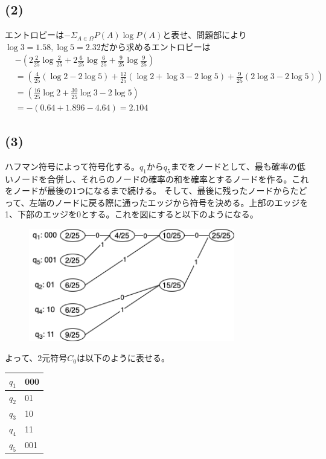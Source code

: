 \documentclass[a4paper,12pt,xelatex,ja=standard]{bxjsarticle}
\begin{document}
  \subsection*{(2)}
  エントロピーは$-\Sigma_{A \in \Omega} P(A) \log P(A)$と表せ、問題部により$\log 3 = 1.58, \log 5 = 2.32$だから求めるエントロピーは
  \begin{equation*}
    \begin{split}
    &-(2\frac{2}{25}\log \frac{2}{25} + 2 \frac{6}{25} \log \frac{6}{25} + \frac{9}{25} \log \frac{9}{25}) \\
    &= (\frac{4}{25}(\log 2 - 2 \log 5) + \frac{12}{25}(\log 2 + \log 3 - 2 \log 5) + \frac{9}{25}(2 \log 3 - 2 \log 5)) \\
    &= (\frac{16}{25} \log 2 + \frac{30}{25} \log 3 - 2 \log 5) \\
    &= -(0.64 + 1.896 - 4.64) = 2.104
    \end{split}
  \end{equation*}

  \subsection*{(3)}
  ハフマン符号によって符号化する。$q_1$から$q_5$までをノードとして、最も確率の低いノードを合併し、それらのノードの確率の和を確率とするノードを作る。これをノードが最後の1つになるまで続ける。
  そして、最後に残ったノードからたどって、左端のノードに戻る際に通ったエッジから符号を決める。上部のエッジを1、下部のエッジを0とする。これを図にすると以下のようになる。
  \begin{figure}[H]
    \centering
    \includegraphics[width=9cm]{images/2020huffman_tree.png}
  \end{figure}
  よって、2元符号$C_0$は以下のように表せる。
  \begin{center}
    \begin{tabular}{ |l|l| }
    \hline
    \textit{$q_1$} & 000 \\ \hline
    \textbf{$q_2$} & 01  \\ \hline
    $q_3$          & 10  \\ \hline
    $q_4$          & 11  \\ \hline
    $q_5$          & 001 \\ \hline
    \end{tabular}
  \end{center}
\end{document}
